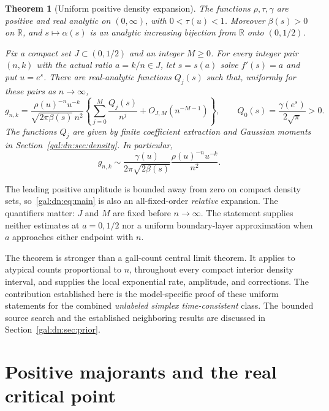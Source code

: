 \documentclass[11pt,letterpaper]{article}
\numberwithin{equation}{section}
\newtheorem{theorem}{Theorem}[section]
\theoremstyle{definition}\newtheorem{definition}[theorem]{Definition}
\theoremstyle{remark}\newtheorem{remark}[theorem]{Remark}
\newcommand{\R}{\mathbb R}
\begin{document}
\begin{theorem}[Uniform positive density expansion]\label{gal:dn:thm:main}
The functions $\rho,\tau,\gamma$ are positive and real analytic on $(0,\infty)$, with $0<\tau(u)<1$. Moreover $\beta(s)>0$ on $\R$, and $s\mapsto\alpha(s)$ is an analytic increasing bijection from $\R$ onto $(0,1/2)$.

Fix a compact set $J\subset(0,1/2)$ and an integer $M\geq0$. For every integer pair $(n,k)$ with the actual ratio $a=k/n\in J$, let $s=s(a)$ solve $f'(s)=a$ and put $u=e^s$. There are real-analytic functions $Q_j(s)$ such that, uniformly for these pairs as $n\to\infty$,
\begin{equation}\label{gal:dn:eq:main}
 g_{n,k}=\frac{\rho(u)^{-n}u^{-k}}{\sqrt{2\pi\beta(s)}\,n^2}
 \left\{\sum_{j=0}^M\frac{Q_j(s)}{n^j}
                  +O_{J,M}(n^{-M-1})\right\},
 \qquad Q_0(s)=\frac{\gamma(e^s)}{2\sqrt\pi}>0.
\end{equation}
The functions $Q_j$ are given by finite coefficient extraction and Gaussian moments in Section~\ref{gal:dn:sec:density}. In particular,
\begin{equation}\label{gal:dn:eq:leading}
 g_{n,k}\sim\frac{\gamma(u)}{2\pi\sqrt{2\beta(s)}}
                 \frac{\rho(u)^{-n}u^{-k}}{n^2}.
\end{equation}
\end{theorem}

The leading positive amplitude is bounded away from zero on compact density sets, so~\eqref{gal:dn:eq:main} is also an all-fixed-order \emph{relative} expansion. The quantifiers matter: $J$ and $M$ are fixed before $n\to\infty$. The statement supplies neither estimates at $a=0,1/2$ nor a uniform boundary-layer approximation when $a$ approaches either endpoint with $n$.

The theorem is stronger than a gall-count central limit theorem. It applies to atypical counts proportional to $n$, throughout every compact interior density interval, and supplies the local exponential rate, amplitude, and corrections. The contribution established here is the model-specific proof of these uniform statements for the combined \emph{unlabeled simplex time-consistent} class. The bounded source search and the established neighboring results are discussed in Section~\ref{gal:dn:sec:prior}.

\section{Positive majorants and the real critical point}\label{gal:dn:sec:real}
\end{document}
